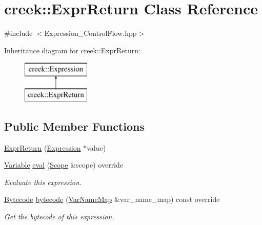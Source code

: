 \hypertarget{classcreek_1_1_expr_return}{}\section{creek\+:\+:Expr\+Return Class Reference}
\label{classcreek_1_1_expr_return}


{\ttfamily \#include $<$Expression\+\_\+\+Control\+Flow.\+hpp$>$}

Inheritance diagram for creek\+:\+:Expr\+Return\+:\begin{figure}[H]
\begin{center}
\leavevmode
\includegraphics[height=2.000000cm]{classcreek_1_1_expr_return}
\end{center}
\end{figure}
\subsection*{Public Member Functions}
\begin{DoxyCompactItemize}
\item 
\hyperlink{classcreek_1_1_expr_return_a099a59822b6e4e3dd0454d182733c6ee}{Expr\+Return} (\hyperlink{classcreek_1_1_expression}{Expression} $\ast$value)
\item 
\hyperlink{classcreek_1_1_variable}{Variable} \hyperlink{classcreek_1_1_expr_return_a4f3c6f5a47a56cbb99599fadc3b63a4f}{eval} (\hyperlink{classcreek_1_1_scope}{Scope} \&scope) override
\begin{DoxyCompactList}\small\item\em Evaluate this expression. \end{DoxyCompactList}\item 
\hyperlink{classcreek_1_1_bytecode}{Bytecode} \hyperlink{classcreek_1_1_expr_return_a799884080709ba14f483c38eafa8c91e}{bytecode} (\hyperlink{classcreek_1_1_var_name_map}{Var\+Name\+Map} \&var\+\_\+name\+\_\+map) const  override\hypertarget{classcreek_1_1_expr_return_a799884080709ba14f483c38eafa8c91e}{}\label{classcreek_1_1_expr_return_a799884080709ba14f483c38eafa8c91e}

\begin{DoxyCompactList}\small\item\em Get the bytecode of this expression. \end{DoxyCompactList}\end{DoxyCompactItemize}


